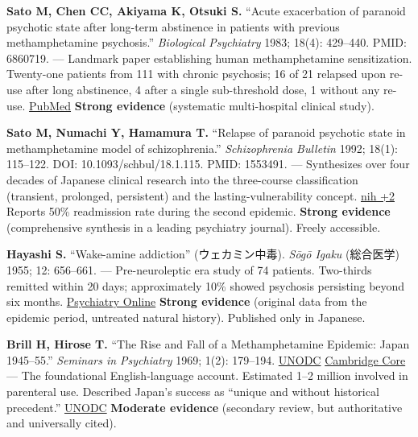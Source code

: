 \textbf{Sato M, Chen CC, Akiyama K, Otsuki S.} ``Acute exacerbation of paranoid psychotic state after long-term abstinence in patients with previous methamphetamine psychosis.'' \emph{Biological Psychiatry} 1983; 18(4): 429--440. PMID: 6860719. --- Landmark paper establishing human methamphetamine sensitization. Twenty-one patients from 111 with chronic psychosis; 16 of 21 relapsed upon re-use after long abstinence, 4 after a single sub-threshold dose, 1 without any re-use. \href{https://pubmed.ncbi.nlm.nih.gov/6860719/}{PubMed} \textbf{Strong evidence} (systematic multi-hospital clinical study).

\textbf{Sato M, Numachi Y, Hamamura T.} ``Relapse of paranoid psychotic state in methamphetamine model of schizophrenia.'' \emph{Schizophrenia Bulletin} 1992; 18(1): 115--122. DOI: 10.1093/schbul/18.1.115. PMID: 1553491. --- Synthesizes over four decades of Japanese clinical research into the three-course classification (transient, prolonged, persistent) and the lasting-vulnerability concept. \href{https://pubmed.ncbi.nlm.nih.gov/1553491/}{nih +2} Reports 50\% readmission rate during the second epidemic. \textbf{Strong evidence} (comprehensive synthesis in a leading psychiatry journal). Freely accessible.

\textbf{Hayashi S.} ``Wake-amine addiction'' (ウェカミン中毒). \emph{Sōgō Igaku} (総合医学) 1955; 12: 656--661. --- Pre-neuroleptic era study of 74 patients. Two-thirds remitted within 20 days; approximately 10\% showed psychosis persisting beyond six months. \href{https://psychiatryonline.org/doi/10.1176/appi.ajp.2009.08111695}{Psychiatry Online} \textbf{Strong evidence} (original data from the epidemic period, untreated natural history). Published only in Japanese.

\textbf{Brill H, Hirose T.} ``The Rise and Fall of a Methamphetamine Epidemic: Japan 1945--55.'' \emph{Seminars in Psychiatry} 1969; 1(2): 179--194. \href{https://www.unodc.org/unodc/en/data-and-analysis/bulletin/bulletin_1980-01-01_1_page002.html}{UNODC} \href{https://www.cambridge.org/core/journals/journal-of-asian-studies/article/abs/methamphetamine-solution-drugs-and-the-reconstruction-of-nation-in-postwar-japan/0A0FCE7E74AE7D1ECE9A134114773CE6}{Cambridge Core} --- The foundational English-language account. Estimated 1--2 million involved in parenteral use. Described Japan's success as ``unique and without historical precedent.'' \href{https://www.unodc.org/unodc/en/data-and-analysis/bulletin/bulletin_1980-01-01_1_page002.html}{UNODC} \textbf{Moderate evidence} (secondary review, but authoritative and universally cited).

